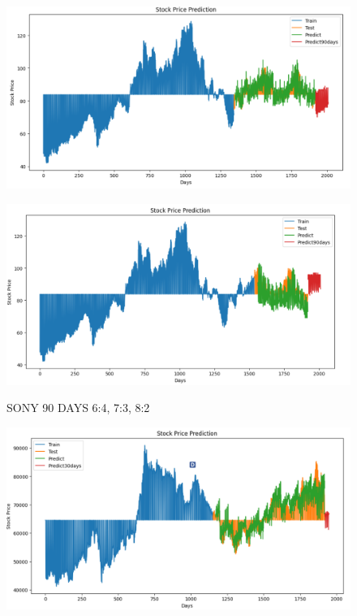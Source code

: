 \documentclass{article}
\begin{document}
\begin{multicols}{2}
\begin{figure}[H]
\begin{minipage}{0.15\textwidth}
    \label{fig:1}
    \end{minipage}%
    \begin{minipage}{0.15\textwidth}
    \centering
    \includegraphics[width=1\textwidth]{Image/N_Beat/N_BEAT_7_3_SONY_90DAYS.png}
  
    \label{fig:2}
    \end{minipage}%
    \begin{minipage}{0.15\textwidth}
    \centering
    \includegraphics[width=1\textwidth]{Image/N_Beat/N_BEAT_8_2_SONY_90DAYS.png}

    \label{fig:3}
    \end{minipage}
    \caption{SONY 90 DAYS  6:4, 7:3, 8:2 }
\end{figure}


\begin{figure}[H]
    \centering
    \begin{minipage}{0.15\textwidth}
    \centering
    \includegraphics[width=1\textwidth]{Image/N_Beat/N_BEAT_6_4_SAMSUNG_30DAYS.png}
   

\end{minipage}
\end{figure}
\end{multicols}
\end{document}
